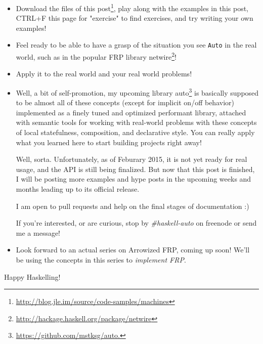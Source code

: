\documentclass[]{article}
\renewcommand{\href}[2]{#2\footnote{\url{#1}}}
\begin{document}
\begin{itemize}
\item
  \href{http://blog.jle.im/source/code-samples/machines}{Download the files of
  this post}, play along with the examples in this post, CTRL+F this page for
  "exercise" to find exercises, and try writing your own examples!
\item
  Feel ready to be able to have a grasp of the situation you see \texttt{Auto}
  in the real world, such as in the popular FRP library
  \href{http://hackage.haskell.org/package/netwire}{netwire}!
\item
  Apply it to the real world and your real world problems!
\item
  Well, a bit of self-promotion, my upcoming library
  \href{https://github.com/mstksg/auto.}{auto} is basically supposed to be
  almost all of these concepts (except for implicit on/off behavior) implemented
  as a finely tuned and optimized performant library, attached with semantic
  tools for working with real-world problems with these concepts of local
  statefulness, composition, and declarative style. You can really apply what
  you learned here to start building projects right away!

  Well, sorta. Unfortunately, as of Feburary 2015, it is not yet ready for real
  usage, and the API is still being finalized. But now that this post is
  finished, I will be posting more examples and hype posts in the upcoming weeks
  and months leading up to its official release.

  I am open to pull requests and help on the final stages of documentation :)

  If you're interested, or are curious, stop by \emph{\#haskell-auto} on
  freenode or send me a message!
\item
  Look forward to an actual series on Arrowized FRP, coming up soon! We'll be
  using the concepts in this series to \emph{implement FRP}.
\end{itemize}

Happy Haskelling!
\end{document}
